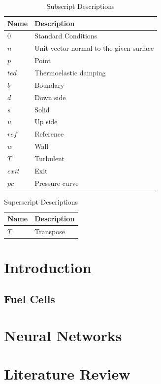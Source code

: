 \documentclass{report}
\begin{document}
    \begin{table}[H]
    \centering
    \begin{tabularx}{\textwidth}{AB}
    \toprule
    \textbf{Name} & \textbf{Description} \\ 
    \midrule
    \( 0 \) & Standard Conditions \\ 
    \( n \) & Unit vector normal to the given surface \\ 
    \( p \) & Point \\ 
    \( ted \) & Thermoelastic damping \\ 
    \( b \) & Boundary \\ 
    \( d \) & Down side \\ 
    \( s \) & Solid \\ 
    \( u \) & Up side \\ 
    \( ref \) & Reference \\ 
    \( w \) & Wall \\ 
    \( T \) & Turbulent \\ 
    \( exit \) & Exit \\ 
    \( pc \) & Pressure curve \\ 
    \bottomrule
    \end{tabularx}
    \caption{Subscript Descriptions}
    \label{tab:subscripts}
    \end{table}

    \begin{table}[H]
    \centering
    \begin{tabularx}{\textwidth}{AB}
    \toprule
    \textbf{Name} & \textbf{Description} \\ 
    \midrule
    \( T \) & Transpose \\ 
    \bottomrule
    \end{tabularx}
    \caption{Superscript Descriptions}
    \label{tab:superscripts}
    \end{table}

\newpage \chapter{Introduction}
\section{Fuel Cells}
\newpage \chapter{Neural Networks}
\newpage \chapter{Literature Review}
\end{document}
